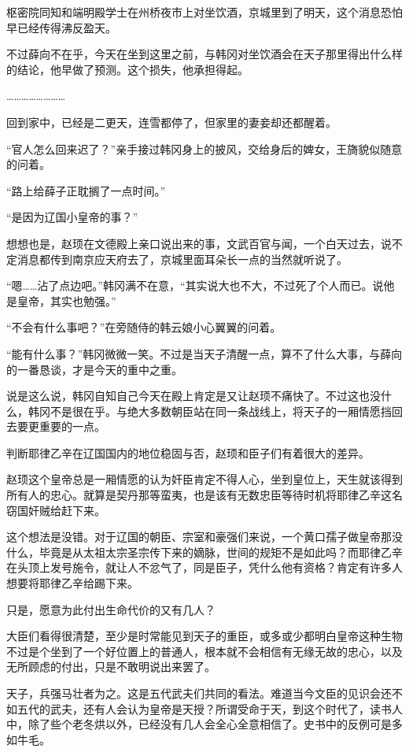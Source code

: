 枢密院同知和端明殿学士在州桥夜市上对坐饮酒，京城里到了明天，这个消息恐怕早已经传得沸反盈天。 

不过薛向不在乎，今天在坐到这里之前，与韩冈对坐饮酒会在天子那里得出什么样的结论，他早做了预测。这个损失，他承担得起。 

…………………… 

回到家中，已经是二更天，连雪都停了，但家里的妻妾却还都醒着。 

“官人怎么回来迟了？”亲手接过韩冈身上的披风，交给身后的婢女，王旖貌似随意的问着。 

“路上给薛子正耽搁了一点时间。” 

“是因为辽国小皇帝的事？” 

想想也是，赵顼在文德殿上亲口说出来的事，文武百官与闻，一个白天过去，说不定消息都传到南京应天府去了，京城里面耳朵长一点的当然就听说了。 

“嗯……沾了点边吧。”韩冈满不在意，“其实说大也不大，不过死了个人而已。说他是皇帝，其实也勉强。” 

“不会有什么事吧？”在旁随侍的韩云娘小心翼翼的问着。 

“能有什么事？”韩冈微微一笑。不过是当天子清醒一点，算不了什么大事，与薛向的一番恳谈，才是今天的重中之重。 

说是这么说，韩冈自知自己今天在殿上肯定是又让赵顼不痛快了。不过这也没什么，韩冈不是很在乎。与绝大多数朝臣站在同一条战线上，将天子的一厢情愿挡回去要更重要的一点。

判断耶律乙辛在辽国国内的地位稳固与否，赵顼和臣子们有着很大的差异。 

赵顼这个皇帝总是一厢情愿的认为奸臣肯定不得人心，坐到皇位上，天生就该得到所有人的忠心。就算是契丹那等蛮夷，也是该有无数忠臣等待时机将耶律乙辛这名窃国奸贼给赶下来。 

这个想法是没错。对于辽国的朝臣、宗室和豪强们来说，一个黄口孺子做皇帝那没什么，毕竟是从太祖太宗圣宗传下来的嫡脉，世间的规矩不是如此吗？而耶律乙辛在头顶上发号施令，就让人不忿气了，同是臣子，凭什么他有资格？肯定有许多人想要将耶律乙辛给踢下来。

只是，愿意为此付出生命代价的又有几人？ 

大臣们看得很清楚，至少是时常能见到天子的重臣，或多或少都明白皇帝这种生物不过是个坐到了一个好位置上的普通人，根本就不会相信有无缘无故的忠心，以及无所顾虑的付出，只是不敢明说出来罢了。 

天子，兵强马壮者为之。这是五代武夫们共同的看法。难道当今文臣的见识会还不如五代的武夫，还有人会认为皇帝是天授？所谓受命于天，到这个时代了，读书人中，除了些个老冬烘以外，已经没有几人会全心全意相信了。史书中的反例可是多如牛毛。 

